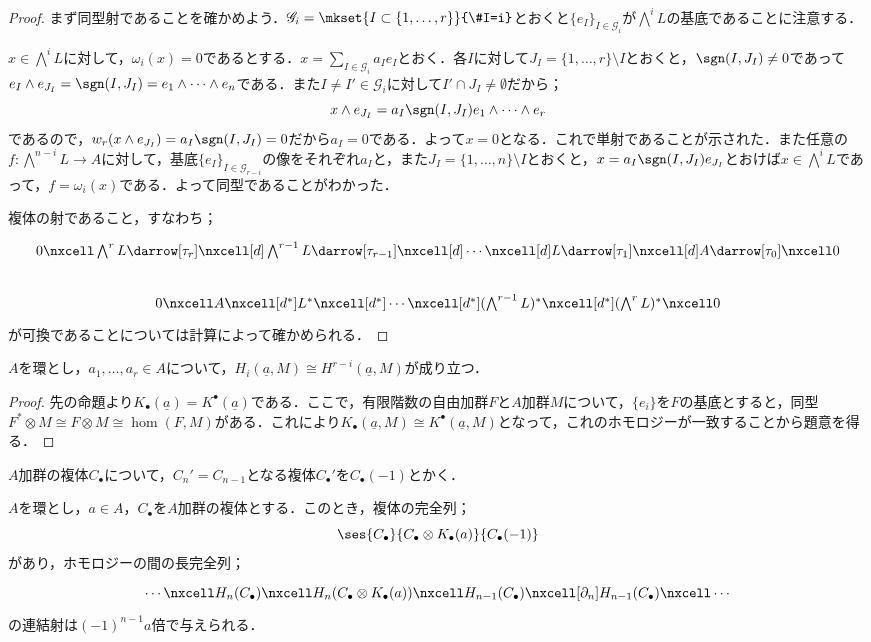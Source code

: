 \begin{proof}
	まず同型射であることを確かめよう．$\mathscr{G}_i=\mkset{I\subset\{1,\dots,r\}}{\#I=i}$とおくと$\{e_I\}_{I\in\mathscr{G}_i}$が$\bigwedge^i L$の基底であることに注意する．
	
	$x\in\bigwedge^i L$に対して，$\omega_i(x)=0$であるとする．$x=\sum_{I\in\mathscr{G}_i}a_Ie_I$とおく．各$I$に対して$J_I=\{1,\dots,r\}\setminus I$とおくと，$\sgn(I,J_I)\neq0$であって$e_I\wedge e_{J_I}=\sgn(I,J_I)=e_1\wedge\dots\wedge e_n$である．また$I\neq I'\in\mathscr{G}_i$に対して$I'\cap J_I\neq\emptyset$だから；
	\[x\wedge e_{J_I}=a_I\sgn(I,J_I)e_1\wedge\dots\wedge e_r\]
	であるので，$w_r(x\wedge e_{J_I})=a_I\sgn(I,J_I)=0$だから$a_I=0$である．よって$x=0$となる．これで単射であることが示された．また任意の$f:\bigwedge^{n-i}L\to A$に対して，基底$\{e_I\}_{I\in\mathscr{G}_{r-i}}$の像をそれぞれ$a_I$と，また$J_I=\{1,\dots,n\}\setminus I$とおくと，$x=a_I\sgn(I,J_I)e_{J_I}$とおけば$x\in\bigwedge^i L$であって，$f=\omega_i(x)$である．よって同型であることがわかった．
	
	複体の射であること，すなわち；
	\[\begin{tikzcd}
	0\nxcell\bigwedge^r L\darrow[\tau_r]\nxcell[d]\bigwedge^{r-1}L\darrow[\tau_{r-1}]\nxcell[d]\cdots\nxcell[d]L\darrow[\tau_1]\nxcell[d]A\darrow[\tau_0]\nxcell 0\\
	0\nxcell A\nxcell[d^\ast] L^\ast\nxcell[d^\ast]\cdots\nxcell[d^\ast](\bigwedge^{r-1}L)^\ast\nxcell[d^\ast](\bigwedge^r L)^\ast\nxcell 0
	\end{tikzcd}\]
	が可換であることについては計算によって確かめられる．
\end{proof}

\begin{cor}\label{cor:Koszul hom と cohom}
	$A$を環とし，$a_1,\dots,a_r\in A$について，$H_i(\underline{a},M)\cong H^{r-i}(\underline{a},M)$が成り立つ．
\end{cor}
\begin{proof}
	先の命題より$K_\bullet(\underline{a})=K^\bullet(\underline{a})$である．ここで，有限階数の自由加群$F$と$A$加群$M$について，$\{e_i\}$を$F$の基底とすると，同型$F^\ast\otimes M\cong F\otimes M\cong\hom (F,M)$がある．これにより$K_\bullet(\underline{a},M)\cong K^\bullet(\underline{a},M)$となって，これのホモロジーが一致することから題意を得る．
\end{proof}

$A$加群の複体$C_\bullet$について，$C_n'=C_{n-1}$となる複体$C_\bullet'$を$C_\bullet(-1)$とかく．%
\begin{lem}\label{lem:C_bulletとC_bullet(-1)の間の完全列}
	$A$を環とし，$a\in A$，$C_\bullet$を$A$加群の複体とする．このとき，複体の完全列；
	\[\ses{C_\bullet}{C_\bullet\otimes K_\bullet(a)}{C_\bullet(-1)}\]
	があり，ホモロジーの間の長完全列；
	\[\begin{tikzcd}
	\cdots\nxcell H_n(C_\bullet)\nxcell H_n(C_\bullet\otimes K_\bullet(a))\nxcell H_{n-1}(C_\bullet)\nxcell[\partial_n] H_{n-1}(C_\bullet)\nxcell\cdots
	\end{tikzcd}\]
	の連結射は$(-1)^{n-1}a$倍で与えられる．
\end{lem}

